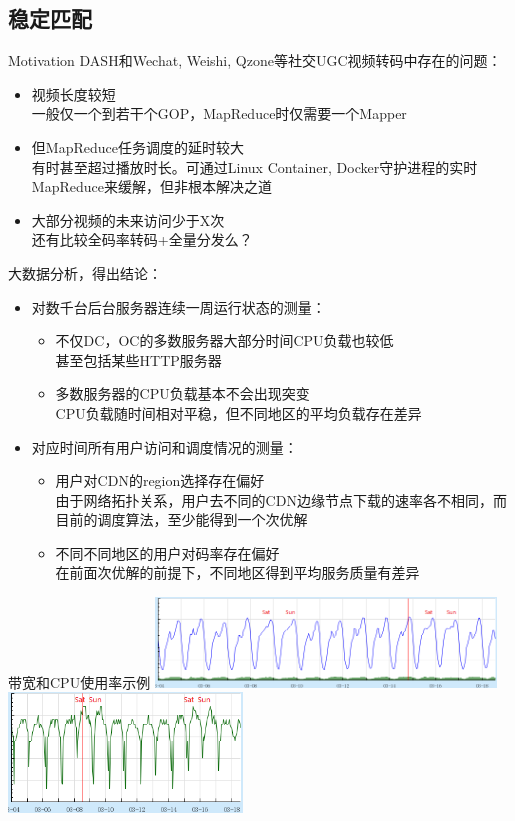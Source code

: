 \documentclass{beamer}
\begin{document}
\subsection{稳定匹配}
\begin{frame}{Motivation}
DASH和Wechat, Weishi, Qzone等社交UGC视频转码中存在的问题：\pause
\begin{itemize}
\item 视频长度较短\\
一般仅一个到若干个GOP，MapReduce时仅需要一个Mapper
\item 但MapReduce任务调度的延时较大\\
有时甚至超过播放时长。可通过Linux Container, Docker守护进程的实时MapReduce来缓解，但非根本解决之道
\item 大部分视频的未来访问少于X次\\
还有比较全码率转码+全量分发么？
\end{itemize}
\end{frame}
\begin{frame}{大数据分析，得出结论：}
\begin{itemize}
	\item 对数千台后台服务器连续一周运行状态的测量：\\
		\begin{itemize}
		\item 不仅DC，OC的多数服务器大部分时间CPU负载也较低\\
		甚至包括某些HTTP服务器
		\item 多数服务器的CPU负载基本不会出现突变\\
		CPU负载随时间相对平稳，但不同地区的平均负载存在差异
		\end{itemize}
	\item 对应时间所有用户访问和调度情况的测量：\\
		\begin{itemize}
		\item 用户对CDN的region选择存在偏好\\
		由于网络拓扑关系，用户去不同的CDN边缘节点下载的速率各不相同，而目前的调度算法，至少能得到一个次优解
		\item 不同不同地区的用户对码率存在偏好\\
		在前面次优解的前提下，不同地区得到平均服务质量有差异
	\end{itemize}
\end{itemize}
\end{frame}
\begin{frame}{带宽和CPU使用率示例}
\includegraphics[height=2.4cm]{fig/bandwidth.png}\\
\includegraphics[height=3.2cm]{fig/cpu_usage.png}
\end{frame}
\end{document}
